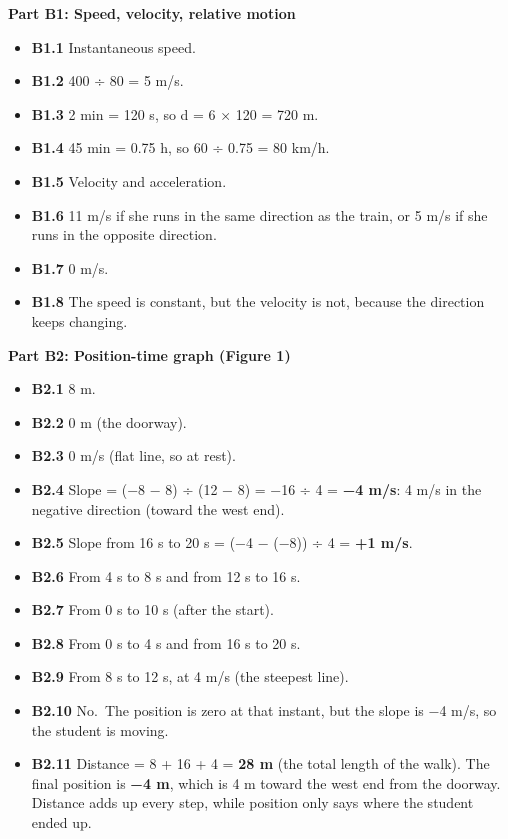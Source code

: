 \documentclass[
]{article}
\providecommand{\tightlist}{%
  \setlength{\itemsep}{0pt}\setlength{\parskip}{0pt}}
\begin{document}
\textbf{Part B1: Speed, velocity, relative motion}

\begin{itemize}
\tightlist
\item
  \textbf{B1.1} Instantaneous speed.
\item
  \textbf{B1.2} 400 ÷ 80 = 5 m/s.
\item
  \textbf{B1.3} 2 min = 120 s, so d = 6 × 120 = 720 m.
\item
  \textbf{B1.4} 45 min = 0.75 h, so 60 ÷ 0.75 = 80 km/h.
\item
  \textbf{B1.5} Velocity and acceleration.
\item
  \textbf{B1.6} 11 m/s if she runs in the same direction as the train,
  or 5 m/s if she runs in the opposite direction.
\item
  \textbf{B1.7} 0 m/s.
\item
  \textbf{B1.8} The speed is constant, but the velocity is not, because
  the direction keeps changing.
\end{itemize}

\textbf{Part B2: Position-time graph (Figure 1)}

\begin{itemize}
\tightlist
\item
  \textbf{B2.1} 8 m.
\item
  \textbf{B2.2} 0 m (the doorway).
\item
  \textbf{B2.3} 0 m/s (flat line, so at rest).
\item
  \textbf{B2.4} Slope = (−8 − 8) ÷ (12 − 8) = −16 ÷ 4 = \textbf{−4 m/s}:
  4 m/s in the negative direction (toward the west end).
\item
  \textbf{B2.5} Slope from 16 s to 20 s = (−4 − (−8)) ÷ 4 = \textbf{+1
  m/s}.
\item
  \textbf{B2.6} From 4 s to 8 s and from 12 s to 16 s.
\item
  \textbf{B2.7} From 0 s to 10 s (after the start).
\item
  \textbf{B2.8} From 0 s to 4 s and from 16 s to 20 s.
\item
  \textbf{B2.9} From 8 s to 12 s, at 4 m/s (the steepest line).
\item
  \textbf{B2.10} No.~The position is zero at that instant, but the slope
  is −4 m/s, so the student is moving.
\item
  \textbf{B2.11} Distance = 8 + 16 + 4 = \textbf{28 m} (the total length
  of the walk). The final position is \textbf{−4 m}, which is 4 m toward
  the west end from the doorway. Distance adds up every step, while
  position only says where the student ended up.
\end{itemize}
\end{document}
